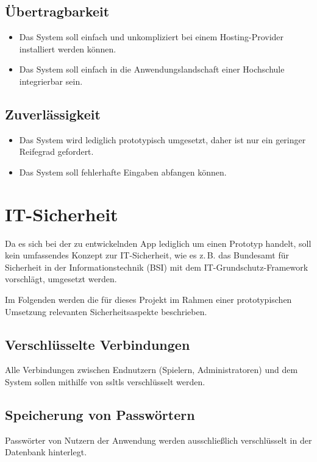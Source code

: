 \documentclass[a4paper,11pt,listof=numbered,glossary=totoc,parskip=half,toc=bib]{scrreprt}
\newcommand{\zB}{\mbox{z.\,B.}\xspace}
\begin{document}
	\subsection{Übertragbarkeit}
	\begin{itemize}
		\item Das System soll einfach und unkompliziert bei einem Hosting-Provider installiert werden können.
		\item Das System soll einfach in die Anwendungslandschaft einer Hochschule integrierbar sein.
\end{itemize}		

	\subsection{Zuverlässigkeit}
	\begin{itemize}
		\item Das System wird lediglich prototypisch umgesetzt, daher ist nur ein geringer Reifegrad gefordert.
		\item Das System soll fehlerhafte Eingaben abfangen können.
	\end{itemize}
	
	\section{IT-Sicherheit}
	\label{sec:itsicherheit}
	
	Da es sich bei der zu entwickelnden App lediglich um einen Prototyp handelt, soll kein umfassendes Konzept zur IT-Sicherheit, wie es \zB das Bundesamt für Sicherheit in der Informationstechnik (BSI) mit dem IT-Grundschutz-Framework vorschlägt, umgesetzt werden.
	
	Im Folgenden werden die für dieses Projekt im Rahmen einer prototypischen Umsetzung relevanten Sicherheitsaspekte beschrieben.
	
	\subsection{Verschlüsselte Verbindungen}
	Alle Verbindungen zwischen Endnutzern (Spielern, Administratoren) und dem System sollen mithilfe von \Gls{ssltls} verschlüsselt werden.
	

	\subsection{Speicherung von Passwörtern}
	Passwörter von Nutzern der Anwendung werden ausschließlich verschlüsselt in der Datenbank hinterlegt.
	
\end{document}
